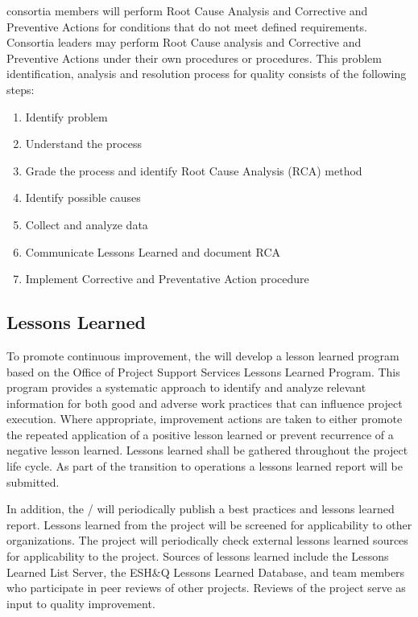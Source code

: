  consortia members will perform Root Cause Analysis and Corrective
and Preventive Actions for conditions that do not meet defined
requirements. Consortia leaders may perform Root Cause analysis and
Corrective and Preventive Actions under their own procedures or
\fnal procedures.  This problem identification, analysis and
resolution process for quality consists of the following steps:
\begin{enumerate}
 \item Identify problem
 \item Understand the process
 \item Grade the process and identify Root Cause Analysis (RCA) method
 \item Identify possible causes
 \item Collect and analyze data
 \item Communicate Lessons Learned and document RCA
 \item Implement Corrective and Preventative Action procedure
\end{enumerate}

\subsection{Lessons Learned}
\label{sec:lessons_learned}

To promote continuous improvement, the   will develop a
lesson learned program based on the \fnal Office of Project Support
Services Lessons Learned Program. This program provides a systematic
approach to identify and analyze relevant information for both good
and adverse work practices that can influence project execution. Where
appropriate, improvement actions are taken to either promote the
repeated application of a positive lesson learned or prevent
recurrence of a negative lesson learned. Lessons learned shall be
gathered throughout the project life cycle. As part of the transition
to operations a lessons learned report will be submitted.

In addition, the /  will
periodically publish a best practices and lessons learned
report. Lessons learned from the  project will be screened
for applicability to other organizations. The  project
will periodically check external lessons learned sources for
applicability to the  project. Sources of lessons learned
include the  Lessons Learned List Server, the \fnal ESH\&Q
Lessons Learned Database, and  team members who
participate in peer reviews of other projects. Reviews of the
 project serve as input to quality improvement.

